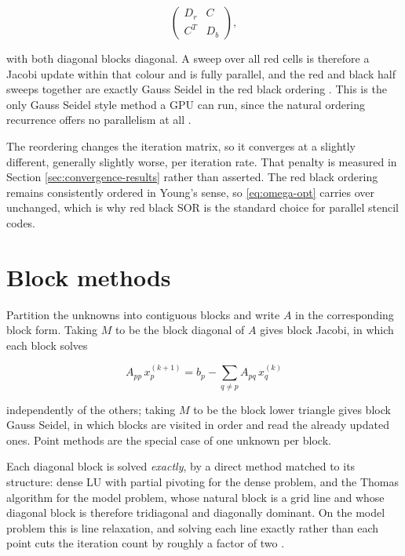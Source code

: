 \begin{equation}
  \begin{pmatrix} D_r & C \\ C^{T} & D_b \end{pmatrix},
\end{equation}

with both diagonal blocks diagonal. A sweep over all red cells is therefore a
Jacobi update within that colour and is fully parallel, and the red and black
half sweeps together are exactly Gauss Seidel in the red black ordering
\cite[Sec.~12.4]{saad2003}. This is the only Gauss Seidel style method a GPU can
run, since the natural ordering recurrence offers no parallelism at all
\cite[Ch.~6]{hager2010}.

The reordering changes the iteration matrix, so it converges at a slightly
different, generally slightly worse, per iteration rate. That penalty is
measured in Section \ref{sec:convergence-results} rather than asserted. The red
black ordering remains consistently ordered in Young's sense, so
\eqref{eq:omega-opt} carries over unchanged, which is why red black SOR is the
standard choice for parallel stencil codes.

\section{Block methods}

Partition the unknowns into contiguous blocks and write $A$ in the corresponding
block form. Taking $M$ to be the block diagonal of $A$ gives block Jacobi, in
which each block solves

\begin{equation}
  A_{pp}\, x_p^{(k+1)} = b_p - \sum_{q \neq p} A_{pq}\, x_q^{(k)}
\end{equation}

independently of the others; taking $M$ to be the block lower triangle gives
block Gauss Seidel, in which blocks are visited in order and read the already
updated ones. Point methods are the special case of one unknown per block.

Each diagonal block is solved \emph{exactly}, by a direct method matched to its
structure: dense LU with partial pivoting for the dense problem, and the Thomas
algorithm for the model problem, whose natural block is a grid line and whose
diagonal block is therefore tridiagonal and diagonally dominant. On the model
problem this is line relaxation, and solving each line exactly rather than each
point cuts the iteration count by roughly a factor of two
\cite[Sec.~4.1.1]{saad2003}.


